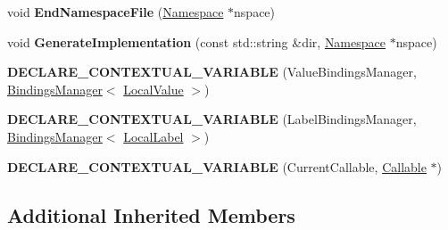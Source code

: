 \begin{DoxyCompactItemize}
\item 
\mbox{\label{classv8_1_1internal_1_1torque_1_1ImplementationVisitor_a2de0552cf5d80a9e0b8ae3537a16a9fe}} 
void {\bfseries End\+Namespace\+File} (\mbox{\hyperlink{classv8_1_1internal_1_1torque_1_1Namespace}{Namespace}} $\ast$nspace)
\item 
\mbox{\label{classv8_1_1internal_1_1torque_1_1ImplementationVisitor_a57cd4b09a442375e71cfe7a7a1aef251}} 
void {\bfseries Generate\+Implementation} (const std\+::string \&dir, \mbox{\hyperlink{classv8_1_1internal_1_1torque_1_1Namespace}{Namespace}} $\ast$nspace)
\item 
\mbox{\label{classv8_1_1internal_1_1torque_1_1ImplementationVisitor_a81c534a3c3e0728371dfb9b1de2400cf}} 
{\bfseries D\+E\+C\+L\+A\+R\+E\+\_\+\+C\+O\+N\+T\+E\+X\+T\+U\+A\+L\+\_\+\+V\+A\+R\+I\+A\+B\+LE} (Value\+Bindings\+Manager, \mbox{\hyperlink{classv8_1_1internal_1_1torque_1_1BindingsManager}{Bindings\+Manager}}$<$ \mbox{\hyperlink{structv8_1_1internal_1_1torque_1_1LocalValue}{Local\+Value}} $>$)
\item 
\mbox{\label{classv8_1_1internal_1_1torque_1_1ImplementationVisitor_a03c79e01af2ecda6eee9fa41346c610e}} 
{\bfseries D\+E\+C\+L\+A\+R\+E\+\_\+\+C\+O\+N\+T\+E\+X\+T\+U\+A\+L\+\_\+\+V\+A\+R\+I\+A\+B\+LE} (Label\+Bindings\+Manager, \mbox{\hyperlink{classv8_1_1internal_1_1torque_1_1BindingsManager}{Bindings\+Manager}}$<$ \mbox{\hyperlink{structv8_1_1internal_1_1torque_1_1LocalLabel}{Local\+Label}} $>$)
\item 
\mbox{\label{classv8_1_1internal_1_1torque_1_1ImplementationVisitor_aa62acb7d498e86be2909559793408531}} 
{\bfseries D\+E\+C\+L\+A\+R\+E\+\_\+\+C\+O\+N\+T\+E\+X\+T\+U\+A\+L\+\_\+\+V\+A\+R\+I\+A\+B\+LE} (Current\+Callable, \mbox{\hyperlink{classv8_1_1internal_1_1torque_1_1Callable}{Callable}} $\ast$)
\end{DoxyCompactItemize}
\subsection*{Additional Inherited Members}


